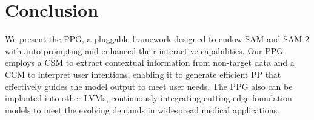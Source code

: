 \section{Conclusion}
\label{sec:conclusion}
We present the PPG, a pluggable framework designed to endow SAM and SAM 2 with auto-prompting and enhanced their interactive capabilities. Our PPG employs a CSM to extract contextual information from non-target data and a CCM to interpret user intentions, enabling it to generate efficient PP that effectively guides the model output to meet user needs. The PPG also can be implanted into other LVMs, continuously integrating cutting-edge foundation models to meet the evolving demands in widespread medical applications.